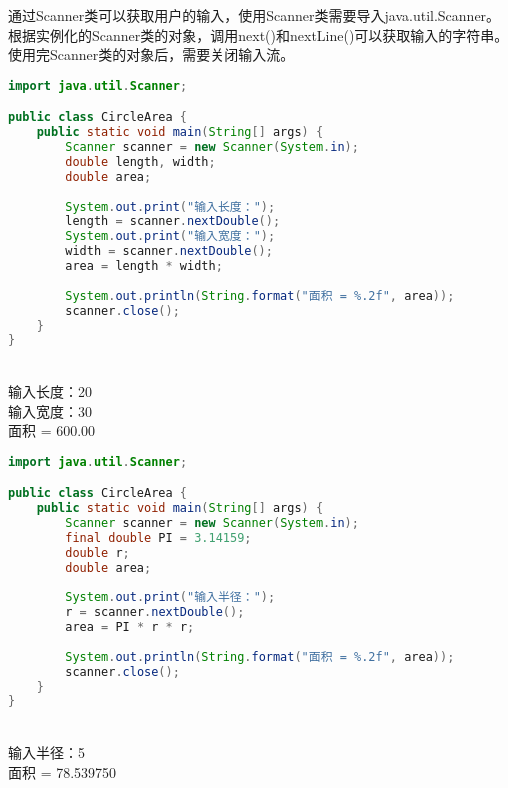 通过Scanner类可以获取用户的输入，使用Scanner类需要导入java.util.Scanner。根据实例化的Scanner类的对象，调用next()和nextLine()可以获取输入的字符串。 \\

使用完Scanner类的对象后，需要关闭输入流。 \\


\begin{lstlisting}[language=Java]
import java.util.Scanner;

public class CircleArea {
	public static void main(String[] args) {
		Scanner scanner = new Scanner(System.in);
		double length, width;
		double area;
		
		System.out.print("输入长度：");
		length = scanner.nextDouble();
		System.out.print("输入宽度：");
		width = scanner.nextDouble();
		area = length * width;
		
		System.out.println(String.format("面积 = %.2f", area));
		scanner.close();
	}
}
\end{lstlisting}

\begin{tcolorbox}
	 \\
	输入长度：20 \\
	输入宽度：30 \\
	面积 = 600.00
\end{tcolorbox}

\vspace{0.5cm}


\begin{lstlisting}[language=Java]
import java.util.Scanner;

public class CircleArea {
	public static void main(String[] args) {
		Scanner scanner = new Scanner(System.in);
		final double PI = 3.14159;
		double r;
		double area;
		
		System.out.print("输入半径：");
		r = scanner.nextDouble();
		area = PI * r * r;
		
		System.out.println(String.format("面积 = %.2f", area));
		scanner.close();
	}
}
\end{lstlisting}

\begin{tcolorbox}
	 \\
	输入半径：5 \\
	面积 = 78.539750
\end{tcolorbox}

\vspace{0.5cm}

